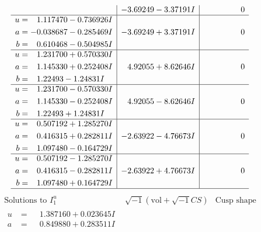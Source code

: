 \documentclass[1p]{elsarticle_modified}
\theoremstyle{definition}
\newcommand{\I}{\sqrt{-1}}
\begin{document}
$$\begin{array}{c|c|c}
 & -3.69249 - 3.37191 I & \phantom{-0.000000 } 0 \\ \hline\begin{aligned}
u &= \phantom{-}1.117470 - 0.736926 I \\
a &= -0.038687 - 0.285469 I \\
b &= \phantom{-}0.610468 - 0.504985 I\end{aligned}
 & -3.69249 + 3.37191 I & \phantom{-0.000000 } 0 \\ \hline\begin{aligned}
u &= \phantom{-}1.231700 + 0.570330 I \\
a &= \phantom{-}1.145330 + 0.252408 I \\
b &= \phantom{-}1.22493 - 1.24831 I\end{aligned}
 & \phantom{-}4.92055 + 8.62646 I & \phantom{-0.000000 } 0 \\ \hline\begin{aligned}
u &= \phantom{-}1.231700 - 0.570330 I \\
a &= \phantom{-}1.145330 - 0.252408 I \\
b &= \phantom{-}1.22493 + 1.24831 I\end{aligned}
 & \phantom{-}4.92055 - 8.62646 I & \phantom{-0.000000 } 0 \\ \hline\begin{aligned}
u &= \phantom{-}0.507192 + 1.285270 I \\
a &= \phantom{-}0.416315 + 0.282811 I \\
b &= \phantom{-}1.097480 - 0.164729 I\end{aligned}
 & -2.63922 - 4.76673 I & \phantom{-0.000000 } 0 \\ \hline\begin{aligned}
u &= \phantom{-}0.507192 - 1.285270 I \\
a &= \phantom{-}0.416315 - 0.282811 I \\
b &= \phantom{-}1.097480 + 0.164729 I\end{aligned}
 & -2.63922 + 4.76673 I & \phantom{-0.000000 } 0\\
 \hline 
 \end{array}$$\newpage$$\begin{array}{c|c|c}  
\text{Solutions to }I^u_{1}& \I (\text{vol} + \sqrt{-1}CS) & \text{Cusp shape}\\
 \hline 
\begin{aligned}
u &= \phantom{-}1.387160 + 0.023645 I \\
a &= \phantom{-}0.849880 + 0.283511 I \\

\end{aligned}
\end{array}$$
\end{document}
